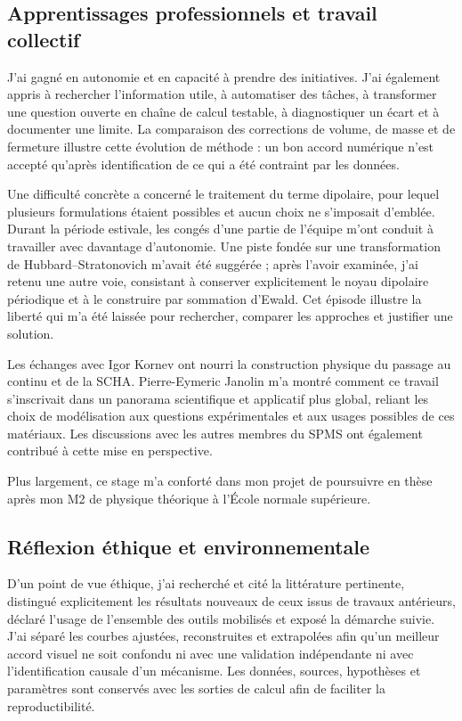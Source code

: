 \documentclass{rapportCS}
\begin{document}
\subsection{Apprentissages professionnels et travail collectif}

J'ai gagné en autonomie et en capacité à prendre des initiatives. J'ai
également appris à rechercher l'information utile, à automatiser des tâches, à
transformer une question ouverte en chaîne de calcul testable, à diagnostiquer
un écart et à documenter une limite. La comparaison des corrections de volume,
de masse et de fermeture illustre cette évolution de méthode : un bon accord
numérique n'est accepté qu'après identification de ce qui a été contraint par
les données.

Une difficulté concrète a concerné le traitement du terme dipolaire, pour
lequel plusieurs formulations étaient possibles et aucun choix ne s'imposait
d'emblée. Durant la période estivale, les congés d'une partie de l'équipe m'ont
conduit à travailler avec davantage d'autonomie. Une piste fondée sur une
transformation de Hubbard--Stratonovich m'avait été suggérée ; après l'avoir
examinée, j'ai retenu une autre voie, consistant à conserver explicitement le
noyau dipolaire périodique et à le construire par sommation d'Ewald. Cet
épisode illustre la liberté qui m'a été laissée pour rechercher, comparer les
approches et justifier une solution.

Les échanges avec Igor Kornev ont nourri la construction physique du passage au
continu et de la SCHA. Pierre-Eymeric Janolin m'a montré comment ce travail
s'inscrivait dans un panorama scientifique et applicatif plus global, reliant
les choix de modélisation aux questions expérimentales et aux usages possibles
de ces matériaux. Les discussions avec les autres membres du SPMS ont
également contribué à cette mise en perspective.

Plus largement, ce stage m'a conforté dans mon projet de poursuivre en thèse
après mon M2 de physique théorique à l'École normale supérieure.

\subsection{Réflexion éthique et environnementale}

D'un point de vue éthique, j'ai recherché et cité la littérature pertinente, distingué
explicitement les résultats nouveaux de ceux issus de travaux antérieurs,
déclaré l'usage de l'ensemble des outils mobilisés et exposé la démarche suivie.
J'ai séparé les courbes ajustées, reconstruites et extrapolées afin qu'un
meilleur accord visuel ne soit confondu ni avec une validation indépendante ni
avec l'identification causale d'un mécanisme. Les données, sources, hypothèses
et paramètres sont conservés avec les sorties de calcul afin de faciliter la
reproductibilité.
\end{document}
